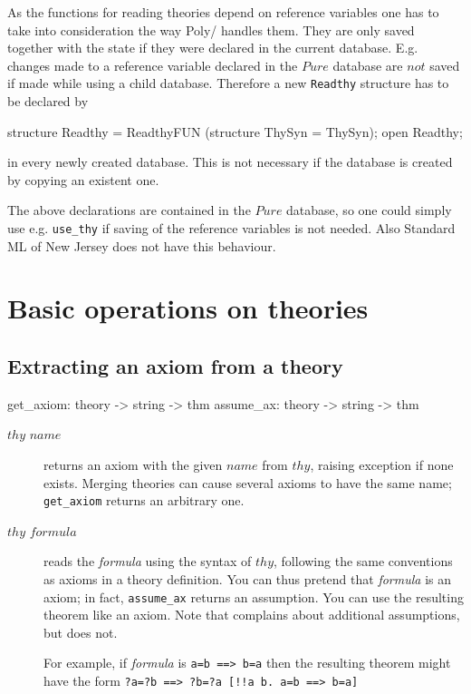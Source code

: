 As the functions for reading theories depend on reference variables one has to
take into consideration the way Poly/\ML{} handles them.  They are only saved
together with the state if they were declared in the current database.  E.g.
changes made to a reference variable declared in the $Pure$ database are $not$
saved if made while using a child database.  Therefore a new {\tt Readthy}
structure has to be declared by
\begin{ttbox}
structure Readthy = ReadthyFUN (structure ThySyn = ThySyn);
open Readthy;
\end{ttbox}
in every newly created database.  This is not necessary if the database is
created by copying an existent one.

The above declarations are contained in the $Pure$ database, so one could
simply use e.g. {\tt use_thy} if saving of the reference variables is not
needed.  Also Standard ML of New Jersey does not have this behaviour.


\section{Basic operations on theories}
\subsection{Extracting an axiom from a theory}
\begin{ttbox} 
get_axiom: theory -> string -> thm
assume_ax: theory -> string -> thm
\end{ttbox}
\begin{description}
\item[ $thy$ $name$] 
returns an axiom with the given $name$ from $thy$, raising exception
 if none exists.  Merging theories can cause several axioms
to have the same name; {\tt get_axiom} returns an arbitrary one.

\item[ $thy$ $formula$] 
reads the {\it formula} using the syntax of $thy$, following the same
conventions as axioms in a theory definition.  You can thus pretend that
{\it formula} is an axiom; in fact, {\tt assume_ax} returns an assumption.
You can use the resulting theorem like an axiom.  Note that 
 complains about additional assumptions, but 
 does not.

For example, if {\it formula} is
\hbox{\tt a=b ==> b=a} then the resulting theorem might have the form
\hbox{\tt\frenchspacing ?a=?b ==> ?b=?a  [!!a b. a=b ==> b=a]}
\end{description}

